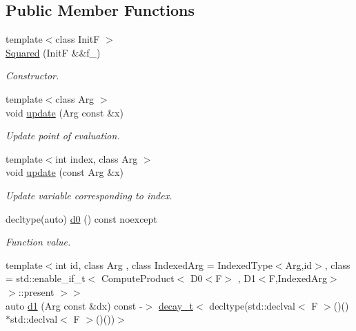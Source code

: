 \subsection*{Public Member Functions}
\begin{DoxyCompactItemize}
\item 
{\footnotesize template$<$class InitF $>$ }\\\hyperlink{structFunG_1_1MathematicalOperations_1_1Squared_accc8f4efa8c54b43c29d71890e8b8bdf}{Squared} (InitF \&\&f\+\_\+)
\begin{DoxyCompactList}\small\item\em Constructor. \end{DoxyCompactList}\item 
{\footnotesize template$<$class Arg $>$ }\\void \hyperlink{structFunG_1_1MathematicalOperations_1_1Squared_abea95d90dc29ac105c43f4eadde84cab}{update} (Arg const \&x)
\begin{DoxyCompactList}\small\item\em Update point of evaluation. \end{DoxyCompactList}\item 
{\footnotesize template$<$int index, class Arg $>$ }\\void \hyperlink{structFunG_1_1MathematicalOperations_1_1Squared_a1d890825175df9b79fd73bf8248496ad}{update} (const Arg \&x)
\begin{DoxyCompactList}\small\item\em Update variable corresponding to index. \end{DoxyCompactList}\item 
decltype(auto) \hyperlink{structFunG_1_1MathematicalOperations_1_1Squared_a57252496703fd8fb6af59beb31b597d7}{d0} () const noexcept
\begin{DoxyCompactList}\small\item\em Function value. \end{DoxyCompactList}\item 
{\footnotesize template$<$int id, class Arg , class Indexed\+Arg  = Indexed\+Type$<$\+Arg,id$>$, class  = std\+::enable\+\_\+if\+\_\+t$<$ Compute\+Product$<$ D0$<$\+F$>$ , D1$<$\+F,\+Indexed\+Arg$>$ $>$\+::present $>$$>$ }\\auto \hyperlink{structFunG_1_1MathematicalOperations_1_1Squared_ab8f7f12fe6001c5650d9c8e18e622769}{d1} (Arg const \&dx) const -\/$>$ \hyperlink{namespaceFunG_a195ac37d8696970c89b112c81a1e4d6e}{decay\+\_\+t}$<$ decltype(std\+::declval$<$ F $>$()()$\ast$std\+::declval$<$ F $>$()())$>$

\end{DoxyCompactItemize}
